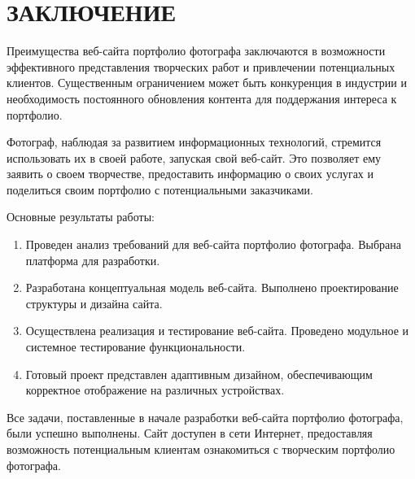 \section*{ЗАКЛЮЧЕНИЕ}

Преимущества веб-сайта портфолио фотографа заключаются в возможности эффективного представления творческих работ и привлечении потенциальных клиентов. Существенным ограничением может быть конкуренция в индустрии и необходимость постоянного обновления контента для поддержания интереса к портфолио.

Фотограф, наблюдая за развитием информационных технологий, стремится использовать их в своей работе, запуская свой веб-сайт. Это позволяет ему заявить о своем творчестве, предоставить информацию о своих услугах и поделиться своим портфолио с потенциальными заказчиками.

Основные результаты работы:

\begin{enumerate}
	\item Проведен анализ требований для веб-сайта портфолио фотографа. Выбрана платформа для разработки.
	\item Разработана концептуальная модель веб-сайта. Выполнено проектирование структуры и дизайна сайта.
	\item Осуществлена реализация и тестирование веб-сайта. Проведено модульное и системное тестирование функциональности.
	\item Готовый проект представлен адаптивным дизайном, обеспечивающим корректное отображение на различных устройствах.
\end{enumerate}

Все задачи, поставленные в начале разработки веб-сайта портфолио фотографа, были успешно выполнены. Сайт доступен в сети Интернет, предоставляя возможность потенциальным клиентам ознакомиться с творческим портфолио фотографа.